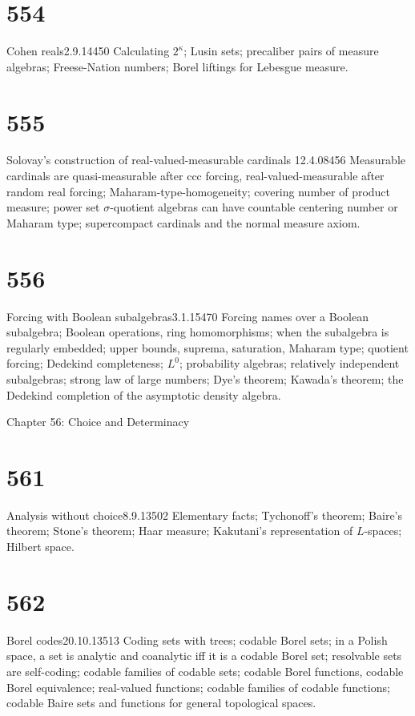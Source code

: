 \section{554}{Cohen reals}{2.9.14}{}{450}
{Calculating $2^{\kappa}$;  Lusin sets;  precaliber pairs of measure
algebras;  Freese-Nation numbers;  Borel liftings for Lebesgue measure.}

\section{555}{Solovay's construction of real-valued-measurable cardinals}
{12.4.08}{}{456}
{Measurable cardinals are quasi-measurable after ccc forcing,
real-valued-measurable after random real forcing;
Maha\discretionary{-}{}{}ram-type-homogeneity;  
covering number of product measure;  power set
$\sigma$-quotient algebras can have countable centering number or Maharam
type;  supercompact cardinals and the normal measure axiom.}

\section{556}{Forcing with Boolean subalgebras}{3.1.15}{}{470}
{Forcing names over a Boolean subalgebra;  
Boolean operations, ring homomorphisms;  when the
subalgebra is regularly embedded;  upper bounds, suprema, saturation,
Maharam type;  quotient forcing;
Dedekind completeness;  $L^0$;  probability algebras;
relatively independent subalgebras;  strong law of large numbers;  Dye's
theorem;  Kawada's theorem;  the Dedekind completion of the asymptotic
density algebra.}


Chapter 56:  Choice and Determinacy


\section{561}{Analysis without choice}{8.9.13}{}{502}
{Elementary facts;  Tychonoff's theorem;  Baire's theorem;  Stone's
theorem;  Haar measure;  Kakutani's representation of $L$-spaces;
Hilbert space.}

\section{562}{Borel codes}{20.10.13}{}{513}
{Coding sets with trees;  codable Borel sets;
in a Polish space, a set is analytic and coanalytic iff it is a 
codable Borel set;  resolvable sets
are self-coding;  codable families of codable sets;  codable Borel
functions, codable Borel equivalence;  real-valued functions;  codable
families of codable functions;  codable Baire sets and functions for
general topological spaces.}

